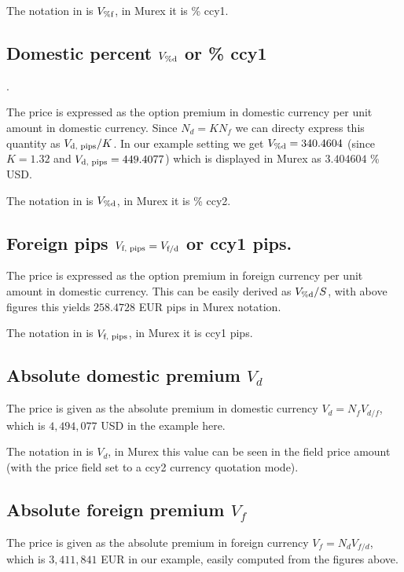 \documentclass{amsart}
\theoremstyle{plain}
\numberwithin{equation}{section}
\begin{document}
The notation in \cite{Clark} is $V_{\%\textnormal{f}}$, in Murex it is \% ccy1.


\subsection{Domestic percent $V_{\%\textnormal{d}}$ or \% ccy1}.

The price is expressed as the option premium in domestic currency per unit amount in domestic currency. Since
$N_d = K N_f$ we can directy express this quantity as $V_{\textnormal{d, pips}} / K$. In our example setting we get
$V_{\%\textnormal{d}} = 340.4604$ (since $K=1.32$ and $V_{\textnormal{d, pips}} = 449.4077$) which is displayed in Murex as 
$3.404604$ \% USD.

The notation in \cite{Clark} is $V_{\%\textnormal{d}}$, in Murex it is \% ccy2.

\subsection{Foreign pips $V_{\textnormal{f, pips}} = V_{\textnormal{f/d}}$ or ccy1 pips.}

The price is expressed as the option premium in foreign currency per unit amount in domestic currency. This can be
easily derived as $V_{\%\textnormal{d}} / S$, with above figures this yields $258.4728$ EUR pips in Murex notation.

The notation in \cite{Clark} is $V_{\textnormal{f, pips}}$, in Murex it is ccy1 pips.

\subsection{Absolute domestic premium $V_d$}

The price is given as the absolute premium in domestic currency $V_d = N_f V_{d/f}$, which is $4,494,077$ USD in
the example here.

The notation in \cite{Clark} is $V_d$, in Murex this value can be seen in the field price amount (with the price
field set to a ccy2 currency quotation mode).

\subsection{Absolute foreign premium $V_f$}

The price is given as the absolute premium in foreign currency $V_f = N_d V_{f/d}$, which is $3,411,841$ EUR in
our example, easily computed from the figures above.
\end{document}
